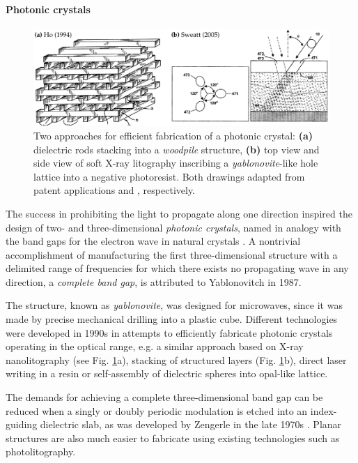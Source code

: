 \paragraph{Photonic crystals}%
\begin{figure}[t] \caption{Two approaches for efficient fabrication of a photonic crystal: \textbf{(a)} dielectric rods stacking into a \textit{woodpile} structure, \textbf{(b)} top view and side view of soft X-ray litography inscribing a \textit{yablonovite}-like hole lattice into a negative photoresist. Both drawings adapted from patent applications  \cite{ho1994periodic} and \cite{sweatt2005method}, respectively.} \label{fg_phc_patents} \centering \includegraphics[width=\textwidth]{img/patents/phc_patents.pdf} \end{figure}
The success in prohibiting the light to propagate along one direction inspired the design of two- and three-dimensional \textit{photonic crystals}, named in analogy with the band gaps for the electron wave in natural crystals \cite{joannopoulos2011photonic}. A nontrivial accomplishment of manufacturing the first three-dimensional structure with a delimited range of frequencies for which there exists no propagating wave in any direction, a \textit{complete band gap}, is attributed to Yablonovitch \cite{yablonovitch1987} in 1987.

The structure, known as \textit{yablonovite}, was designed for microwaves, since it was made by precise mechanical drilling into a plastic cube. Different technologies were developed in 1990s in attempts to efficiently fabricate photonic crystals operating in the optical range, e.g. a similar approach based on X-ray nanolitography (see Fig. \ref{fg_phc_patents}a), stacking of structured layers (Fig. \ref{fg_phc_patents}b), direct laser writing in a resin or self-assembly of dielectric spheres into opal-like lattice.

The demands for achieving a complete three-dimensional band gap can be reduced when a singly or doubly periodic modulation is etched into an index-guiding dielectric slab, as was developed by Zengerle in the late 1970s \cite{zengerle1987light}. Planar structures are also much easier to fabricate using existing technologies such as photolitography.  

